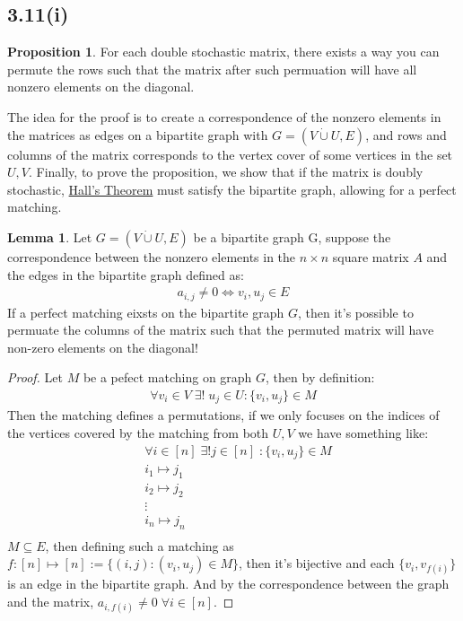 \documentclass[]{article}
\theoremstyle{definition}
\newtheorem{prop}{Proposition}[section]  %
\newtheorem{lemma}{Lemma}[subsection]  %
\begin{document}
    \subsection{3.11(i)}
        \begin{prop}
            For each double stochastic matrix, there exists a way you can permute the rows such that the matrix after such permuation will have all nonzero elements on the diagonal. 
        \end{prop}
        The idea for the proof is to create a correspondence of the nonzero elements in the matrices as edges on a bipartite graph with $G = (V\dot\cup U, E)$, and rows and columns of the matrix corresponds to the vertex cover of some vertices in the set $U, V$. Finally, to prove the proposition, we show that if the matrix is doubly stochastic, \hyperref[theorem:Hall]{Hall's Theorem} must satisfy the bipartite graph, allowing for a perfect matching. 
        \begin{lemma}
            Let $G = (V\dot\cup U, E)$ be a bipartite graph G, suppose the correspondence between the nonzero elements in the $n\times n$ square matrix $A$ and the edges in the bipartite graph defined as: 
            \begin{align}
                a_{i, j}\neq 0 \iff {v_i, u_j} \in E
            \end{align}
            If a perfect matching eixsts on the bipartite graph $G$, then it's possible to permuate the columns of the matrix such that the permuted matrix will have non-zero elements on the diagonal!
        \end{lemma}
        \begin{proof}
            Let $M$ be a pefect matching on graph $G$, then by definition: 
            \begin{align}
                \forall v_i \in V \; \exists!\; u_j \in U: \{v_i, u_j\}\in M
            \end{align}
            Then the matching defines a permutations, if we only focuses on the indices of the vertices covered by the matching from both $U, V$ we have something like: 
            \begin{align}
                & \forall i\in [n] \;\exists ! j\in [n]\; : \{v_i, u_j\} \in {M}
                \\
                & i_1 \mapsto j_1 \\
                & i_2 \mapsto j_2 \\ 
                & \vdots \\ 
                & i_n \mapsto j_n \\
            \end{align}
            $M\subseteq E$, then defining such a matching as $f: [n]\mapsto [n] := \{(i, j): (v_i, u_j)\in M\}$, then it's bijective and each $\{v_i, v_{f(i)}\}$ is an edge in the bipartite graph. And by the correspondence between the graph and the matrix, $a_{i, f(i)} \neq 0 \;\forall i \in [n]$. 
        \end{proof}
\end{document}
